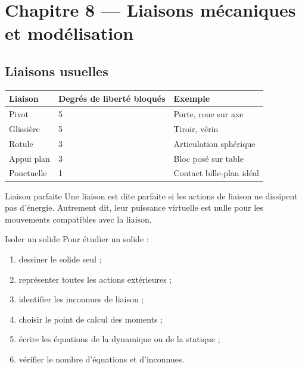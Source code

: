 \documentclass[11pt,a4paper]{article}
\begin{document}
\section{Chapitre 8 — Liaisons mécaniques et modélisation}

\subsection{Liaisons usuelles}

\begin{center}
\begin{tabular}{lll}
\toprule
Liaison & Degrés de liberté bloqués & Exemple \\
\midrule
Pivot & 5 & Porte, roue sur axe \\
Glissière & 5 & Tiroir, vérin \\
Rotule & 3 & Articulation sphérique \\
Appui plan & 3 & Bloc posé sur table \\
Ponctuelle & 1 & Contact bille-plan idéal \\
\bottomrule
\end{tabular}
\end{center}

\begin{definitionbox}{Liaison parfaite}{}
Une liaison est dite parfaite si les actions de liaison ne dissipent pas d'énergie.
Autrement dit, leur puissance virtuelle est nulle pour les mouvements compatibles avec la liaison.
\end{definitionbox}

\begin{methodbox}{Isoler un solide}{}
Pour étudier un solide :
\begin{enumerate}
  \item dessiner le solide seul ;
  \item représenter toutes les actions extérieures ;
  \item identifier les inconnues de liaison ;
  \item choisir le point de calcul des moments ;
  \item écrire les équations de la dynamique ou de la statique ;
  \item vérifier le nombre d'équations et d'inconnues.
\end{enumerate}
\end{methodbox}

\end{document}
